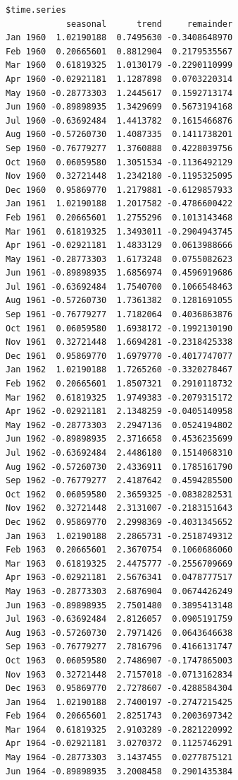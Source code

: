 \documentclass[
  11pt,
  a4paper,
]{report}
\begin{document}
\begin{verbatim}
$time.series
            seasonal      trend     remainder
Jan 1960  1.02190188  0.7495630 -0.3408648970
Feb 1960  0.20665601  0.8812904  0.2179535567
Mar 1960  0.61819325  1.0130179 -0.2290110999
Apr 1960 -0.02921181  1.1287898  0.0703220314
May 1960 -0.28773303  1.2445617  0.1592713174
Jun 1960 -0.89898935  1.3429699  0.5673194168
Jul 1960 -0.63692484  1.4413782  0.1615466876
Aug 1960 -0.57260730  1.4087335  0.1411738201
Sep 1960 -0.76779277  1.3760888  0.4228039756
Oct 1960  0.06059580  1.3051534 -0.1136492129
Nov 1960  0.32721448  1.2342180 -0.1195325095
Dec 1960  0.95869770  1.2179881 -0.6129857933
Jan 1961  1.02190188  1.2017582 -0.4786600422
Feb 1961  0.20665601  1.2755296  0.1013143468
Mar 1961  0.61819325  1.3493011 -0.2904943745
Apr 1961 -0.02921181  1.4833129  0.0613988666
May 1961 -0.28773303  1.6173248  0.0755082623
Jun 1961 -0.89898935  1.6856974  0.4596919686
Jul 1961 -0.63692484  1.7540700  0.1066548463
Aug 1961 -0.57260730  1.7361382  0.1281691055
Sep 1961 -0.76779277  1.7182064  0.4036863876
Oct 1961  0.06059580  1.6938172 -0.1992130190
Nov 1961  0.32721448  1.6694281 -0.2318425338
Dec 1961  0.95869770  1.6979770 -0.4017747077
Jan 1962  1.02190188  1.7265260 -0.3320278467
Feb 1962  0.20665601  1.8507321  0.2910118732
Mar 1962  0.61819325  1.9749383 -0.2079315172
Apr 1962 -0.02921181  2.1348259 -0.0405140958
May 1962 -0.28773303  2.2947136  0.0524194802
Jun 1962 -0.89898935  2.3716658  0.4536235699
Jul 1962 -0.63692484  2.4486180  0.1514068310
Aug 1962 -0.57260730  2.4336911  0.1785161790
Sep 1962 -0.76779277  2.4187642  0.4594285500
Oct 1962  0.06059580  2.3659325 -0.0838282531
Nov 1962  0.32721448  2.3131007 -0.2183151643
Dec 1962  0.95869770  2.2998369 -0.4031345652
Jan 1963  1.02190188  2.2865731 -0.2518749312
Feb 1963  0.20665601  2.3670754  0.1060686060
Mar 1963  0.61819325  2.4475777 -0.2556709669
Apr 1963 -0.02921181  2.5676341  0.0478777517
May 1963 -0.28773303  2.6876904  0.0674426249
Jun 1963 -0.89898935  2.7501480  0.3895413148
Jul 1963 -0.63692484  2.8126057  0.0905191759
Aug 1963 -0.57260730  2.7971426  0.0643646638
Sep 1963 -0.76779277  2.7816796  0.4166131747
Oct 1963  0.06059580  2.7486907 -0.1747865003
Nov 1963  0.32721448  2.7157018 -0.0713162834
Dec 1963  0.95869770  2.7278607 -0.4288584304
Jan 1964  1.02190188  2.7400197 -0.2747215425
Feb 1964  0.20665601  2.8251743  0.2003697342
Mar 1964  0.61819325  2.9103289 -0.2821220992
Apr 1964 -0.02921181  3.0270372  0.1125746291
May 1964 -0.28773303  3.1437455  0.0277875121
Jun 1964 -0.89898935  3.2008458  0.2901435384

\end{verbatim}
\end{document}
